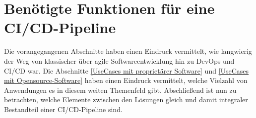 \section{Benötigte Funktionen für eine CI/CD-Pipeline}
\label{Benoetigte Funktionen für eine CI/CD-Pipeline}
Die vorangegangenen Abschnitte haben einen Eindruck vermittelt, wie langwierig der Weg von klassischer über agile Softwareentwicklung hin zu \gls{DevOps} und \acrshort{CI}/\acrshort{CD} war. Die Abschnitte \ref{UseCases mit proprietärer Software}  und \ref{UseCases mit Opensource-Software} haben einen Eindruck vermittelt, welche Vielzahl von Anwendungen es in diesem weiten Themenfeld gibt. Abschließend ist nun zu betrachten, welche Elemente zwischen den Lösungen gleich und damit integraler Bestandteil einer \acrshort{CI}/\acrshort{CD}-Pipeline sind.\newline